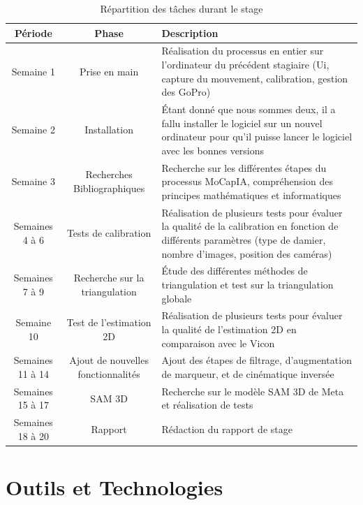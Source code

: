     \begin{table}[h!]
        \centering
        \renewcommand{\arraystretch}{1.5}
        \begin{tabularx}{\textwidth}{|c|c|X|} 
            \hline
            \textbf{Période} & \textbf{Phase} & \textbf{Description} \\
            \hline
            Semaine 1 & Prise en main & Réalisation du processus en entier sur l'ordinateur du précédent stagiaire (Ui, capture du mouvement, calibration, gestion des GoPro) \\
            \hline
            Semaine 2 & Installation & Étant donné que nous sommes deux, il a fallu installer le logiciel sur un nouvel ordinateur pour qu'il puisse lancer le logiciel avec les bonnes versions \\
            \hline
            Semaine 3 & Recherches Bibliographiques & Recherche sur les différentes étapes du processus MoCapIA, compréhension des principes mathématiques et informatiques \\
            \hline
            Semaines 4 à 6 & Tests de calibration & Réalisation de plusieurs tests pour évaluer la qualité de la calibration en fonction de différents paramètres (type de damier, nombre d'images, position des caméras) \\
            \hline
            Semaines 7 à 9 & Recherche sur la triangulation & Étude des différentes méthodes de triangulation et test sur la triangulation globale \\
            \hline
            Semaine 10 & Test de l'estimation 2D & Réalisation de plusieurs tests pour évaluer la qualité de l'estimation 2D en comparaison avec le Vicon \\
            \hline
            Semaines 11 à 14 & Ajout de nouvelles fonctionnalités & Ajout des étapes de filtrage, d'augmentation de marqueur, et de cinématique inversée \\
            \hline
            Semaines 15 à 17 & SAM 3D & Recherche sur le modèle SAM 3D de Meta et réalisation de tests \\
            \hline
            Semaines 18 à 20 & Rapport & Rédaction du rapport de stage \\
            \hline
        \end{tabularx}
        \caption{Répartition des tâches durant le stage}
        \label{tab:planning}
    \end{table}


\section{Outils et Technologies}


